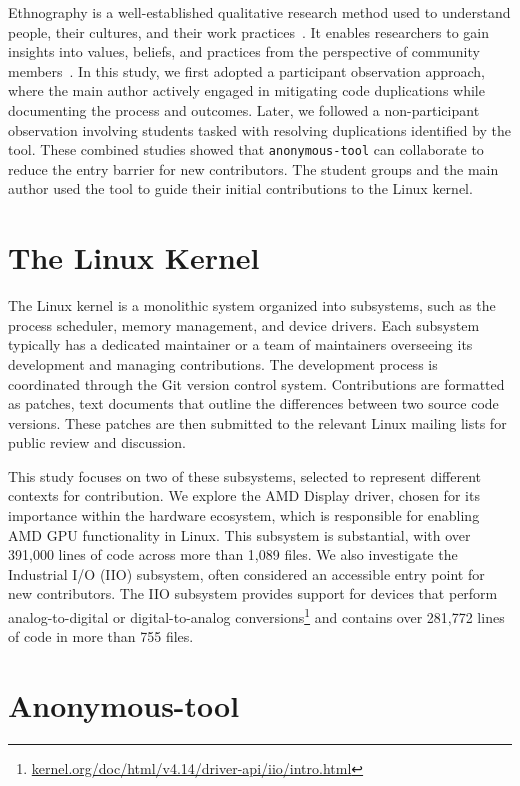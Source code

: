 \documentclass[10pt,conference]{IEEEtran}
\begin{document}
Ethnography is a well-established qualitative research method used to understand people, their cultures, and their work practices~\cite{bookethno}. It enables researchers to gain insights into values, beliefs, and practices from the perspective of community members~\cite{ethnosoft}.  
In this study, we first adopted a participant observation approach, where the main author actively engaged in mitigating code duplications while documenting the process and outcomes. Later, we followed a non-participant observation involving students tasked with resolving duplications identified by the tool. These combined studies showed that \texttt{anonymous-tool} can collaborate to reduce the entry barrier for new contributors. The student groups and the main author used the tool to guide their initial contributions to the Linux kernel.


\section{The Linux Kernel}

The Linux kernel is a monolithic system organized into subsystems, such as the process scheduler, memory management, and device drivers. Each subsystem typically has a dedicated maintainer or a team of maintainers overseeing its development and managing contributions. The development process is coordinated through the Git version control system. Contributions are formatted as patches, text documents that outline the differences between two source code versions. These patches are then submitted to the relevant Linux mailing lists for public review and discussion.

This study focuses on two of these subsystems, selected to represent different contexts for contribution. We explore the AMD Display driver, chosen for its importance within the hardware ecosystem, which is responsible for enabling AMD GPU functionality in Linux. This subsystem is substantial, with over 391,000 lines of code across more than 1,089 files. We also investigate the Industrial I/O (IIO) subsystem, often considered an accessible entry point for new contributors. The IIO subsystem provides support for devices that perform analog-to-digital or digital-to-analog conversions\footnote{\href{https://kernel.org/doc/html/v4.14/driver-api/iio/intro.html}{kernel.org/doc/html/v4.14/driver-api/iio/intro.html}} and contains over 281,772 lines of code in more than 755 files.

\section{Anonymous-tool}
\end{document}
